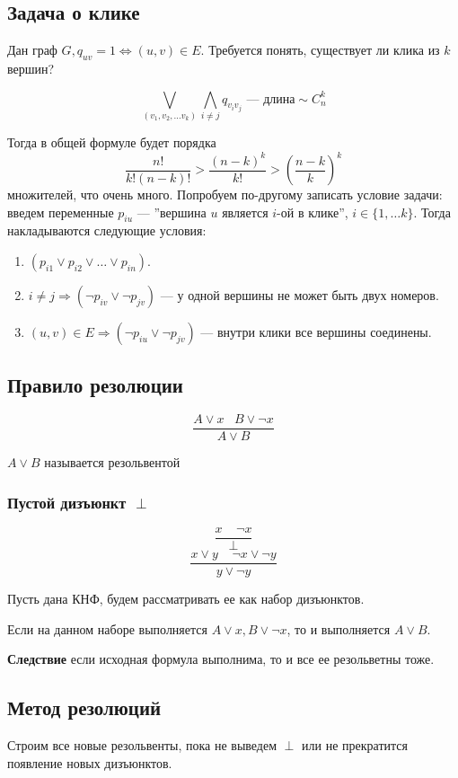 \subsection{Задача о клике}
Дан граф $G, q_{uv} = 1 \Leftrightarrow (u, v) \in E$. Требуется понять, существует ли клика из $k$ вершин?

$$\bigvee_{(v_1, v_2, \dots v_k)}\bigwedge_{i\ne j} q_{v_iv_j} \text{ --- длина} \sim C_n^k $$

Тогда в общей формуле будет порядка 
$$\frac{n!}{k!(n-k)!} > \frac{(n-k)^k}{k!} > \left(\frac{n-k}{k}\right)^k$$
множителей, что очень много. Попробуем по-другому записать условие задачи: введем переменные $p_{iu}$ --- ''вершина $u$ является $i$-ой в клике'', $i \in \{1, \dots k\}$. Тогда накладываются следующие условия:
\begin{enumerate}
    \item $(p_{i1} \vee p_{i2} \vee \dots \vee p_{in})$.
    \item $i \ne j \Rightarrow(\neg p_{iv} \vee \neg p_{jv})$ --- у одной вершины не может быть двух номеров.
    \item $(u, v) \in E \Rightarrow (\neg p_{iu} \vee \neg p_{jv})$ --- внутри клики все вершины соединены.
\end{enumerate}

\subsection{Правило резолюции}
$$\frac{A \vee x\;\;\;B\vee \neg x}{A \vee B}$$

$A \vee B$ называется резольвентой

\subsubsection{Пустой дизъюнкт $\perp$}
$$\frac{x \;\;\;\;\neg x}{\perp}$$
$$\frac{x \vee y \;\;\;\;\neg x \vee \neg y}{y \vee \neg y}$$

Пусть дана КНФ, будем рассматривать ее как набор дизъюнктов.

\begin{proposition}
    Если на данном наборе выполняется $A\vee x, B \vee \neg x$, то и выполняется $A \vee B$.
\end{proposition}
\textbf{Следствие} если исходная формула выполнима, то и все ее резольветны тоже.

\subsection{Метод резолюций}
Строим все новые резольвенты, пока не выведем $\perp$ или не прекратится появление новых дизъюнктов.

